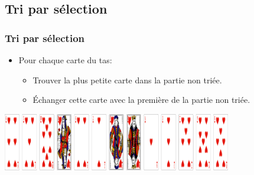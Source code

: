 \documentclass[svgnames,11pt]{beamer}
\begin{document}
\subsection{Tri par sélection}
\begin{frame}
    \frametitle{Tri par sélection}

    \begin{itemize}
        \item Pour chaque carte du tas:
              \begin{itemize}
                  \item Trouver la plus petite carte dans la partie non triée.
                  \item Échanger cette carte avec la première de la partie non triée.
              \end{itemize}

    \end{itemize}

\end{frame}
\begin{frame}

    \begin{center}
        \centering
        \includegraphics[width=10cm]{ressources/jeu-coeur-melange.png}
        \end{center}
        \begin{center}
        \end{center}

\end{frame}
\end{document}

